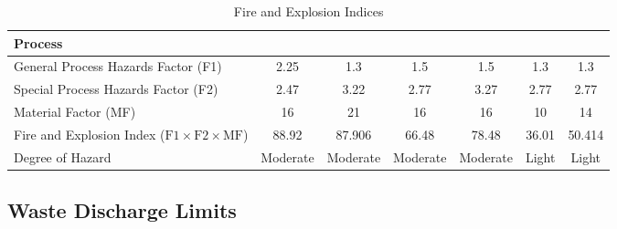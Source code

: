 \begin{landscape}
\begin{table}[H]
\centering
\caption{Fire and Explosion Indices \cite{american_institute_of_chemical_engineers_dows_1994}}
\label{tab:fandeindex}
\begin{tabular}{p{4cm}S[table-format=2.2]S[table-format=2.3]S[table-format=2.2]S[table-format=2.2]S[table-format=2.2]S[table-format=2.3]}
\toprule
Process & {} & {} & {} & {} & {} & {} \\ \midrule
General Process Hazards Factor (F1)                                            & 2.25       & 1.3        & 1.5        & 1.5        & 1.3     & 1.3     \\
Special Process Hazards Factor (F2)                                            & 2.47       & 3.22       & 2.77       & 3.27       & 2.77    & 2.77    \\
Material Factor (MF)                                                           & 16         & 21         & 16         & 16         & 10      & 14      \\ \midrule
Fire and Explosion Index ($\mathrm{F1} \times \mathrm{F2} \times \mathrm{MF}$) & 88.92      & 87.906     & 66.48      & 78.48      & 36.01   & 50.414  \\
Degree of Hazard                                                               & {Moderate} & {Moderate} & {Moderate} & {Moderate} & {Light} & {Light} \\ \bottomrule
\end{tabular}
\end{table}
\end{landscape}


\subsection{Waste Discharge Limits}


